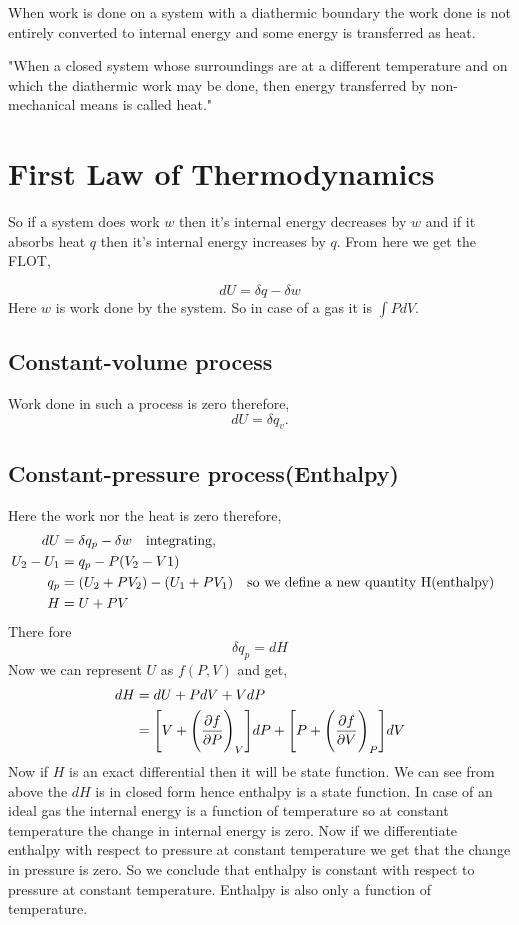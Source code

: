 \documentclass[12pt]{article}
\begin{document}
When work is done on a system with a diathermic boundary the work done is not entirely converted to internal energy and some energy is transferred as heat.  
\begin{center}
	"{\color{blue}When a closed system whose surroundings are at a different temperature and on which the diathermic work may be done, then energy transferred by non-mechanical means is called heat.}"
\end{center}

\section{First Law of Thermodynamics}

So if a system does work $w$ then it's internal energy decreases by $w$ and if it absorbs heat $q$ then it's internal energy increases by $q$. From here we get the FLOT,
\begin{tcolorbox}[title=First Law of thermodynamics(FLOT)]
	$$dU=\delta q-\delta w$$
Here $w$ is work done by the system. So in case of a gas it is $\int PdV$.
\end{tcolorbox}
\subsection{Constant-volume process}
 Work done in such a process is zero therefore, 
 \begin{equation}
 	dU=\delta q_v.
 \end{equation}

\subsection{Constant-pressure process(Enthalpy)}
Here the work nor the heat is zero therefore,
\begin{align*}
	                       dU&=\delta q_p-\delta w \qq{integrating,}\\
	                  U_2-U_1&=q_p-P(V_2-V1) \\
	                      q_p&=(U_2+PV_2)-(U_1+PV_1) \qq{so we define a new quantity H(enthalpy)}\\
	                        H&=U+PV\\
\end{align*}
There fore 
\begin{equation}
	\delta q_p=dH
\end{equation}
Now we can represent $U$ as $f(P,V)$ and get,
\begin{align*}
	dH&=dU+PdV+VdP \\
      &=\Bigg[V+\Bigg(\pdv{f}{P}\Bigg)_V\Bigg]dP+\Bigg[P+\Bigg(\pdv{f}{V}\Bigg)_P\Bigg]dV	
\end{align*}
Now if $H$ is an exact differential then it will be state function. We can see from above the $dH$ is in closed form hence enthalpy is a state function. In case of an ideal gas the internal energy is a function of temperature so at constant temperature the change in internal energy is zero. Now if we differentiate enthalpy with respect to pressure at constant temperature we get that the change in pressure is zero. So we conclude that enthalpy is constant with respect to pressure at constant temperature. Enthalpy is also only a function of temperature. 
\end{document}
